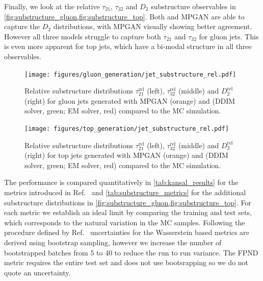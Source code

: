 Finally, we look at the relative $\tau_{21}$, $\tau_{32}$ and $D_{2}$ substructure observables in \cref{fig:substructure_gluon,fig:substructure_top}.
Both \pcjedi and MPGAN are able to capture the $D_2$ distributions, with MPGAN visually showing better agreement.
However all three models struggle to capture both $\tau_{21}$ and $\tau_{32}$ for gluon jets.
This is even more apparent for top jets, which have a bi-modal structure in all three observables.

\begin{figure}[hbpt]
    \centering
    \texttt{[image: figures/gluon\_generation/jet\_substructure\_rel.pdf]}
    \caption{Relative substructure distributions $\tau_{21}^{\text{rel}}$ (left), $\tau_{32}^{\text{rel}}$ (middle) and $D_{2}^{\text{rel}}$ (right) for gluon jets generated with MPGAN (orange) and \pcjedi (DDIM solver, green; EM solver, red) compared to the MC simulation.}
    \label{fig:substructure_gluon}
\end{figure}

\begin{figure}[hbpt]
    \centering
    \texttt{[image: figures/top\_generation/jet\_substructure\_rel.pdf]}
    \caption{Relative substructure distributions $\tau_{21}^{\text{rel}}$ (left), $\tau_{32}^{\text{rel}}$ (middle) and $D_{2}^{\text{rel}}$ (right) for top jets generated with MPGAN (orange) and \pcjedi (DDIM solver, green; EM solver, red) compared to the MC simulation.}
    \label{fig:substructure_top}
\end{figure}

The performance is compared quantitatively in \cref{tab:kansal_results} for the metrics introduced in Ref.~\cite{MPGAN} and \cref{tab:substructure_metrics} for the additional substructure distributions in \cref{fig:substructure_gluon,fig:substructure_top}.
For each metric we establish an ideal limit by comparing the training and test sets, which corresponds to the natural variation in the MC samples.
Following the procedure defined by Ref.~\cite{MPGAN} uncertainties for the Wasserstein based metrics are derived using bootstrap sampling, however we increase the number of bootstrapped batches from 5 to 40 to reduce the run to run variance.
The FPND metric requires the entire test set and does not use bootsrapping so we do not quote an uncertainty.

